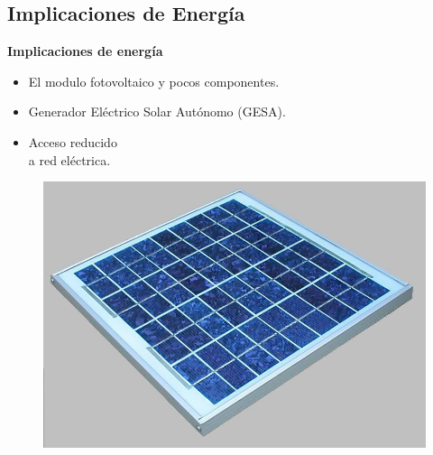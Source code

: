\documentclass[aspectratio=43, handout]{beamer}
\begin{document}
\subsection[Energía]{Implicaciones de Energía}
\begin{frame}{\textbf{\LARGE{Implicaciones de energía}}} 
\fontsize{15pt}{15}\selectfont
\begin{minipage}[c]{1.0\linewidth}
	\begin{minipage}[c]{0.55\linewidth}
		\begin{itemize}
			\item El modulo fotovoltaico y pocos componentes.
					\vspace{10px}
			\item Generador Eléctrico Solar Autónomo (GESA).
					\vspace{10px}
			\item Acceso reducido\\a red eléctrica.
					\vspace{10px}
		\end{itemize}

\end{minipage}
	\begin{minipage}[c]{0.40\linewidth}
		\begin{figure}[H]			
		\includegraphics[width=1.2\textwidth]{./imagenes/ks10t.jpg}
		\end{figure}	  	  	
	\end{minipage}
\end{minipage}
\end{frame}
\end{document}
